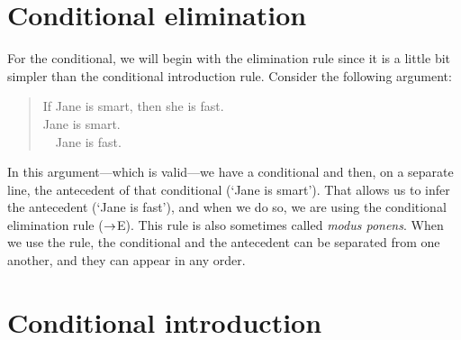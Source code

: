 \section{Conditional elimination}

For the conditional, we will begin with the elimination rule since it is a little bit simpler than the conditional introduction rule. Consider the following argument:
	\begin{quote}
		If Jane is smart, then she is fast.\\
		Jane is smart.\\ 
		\therefore~~Jane is fast.
	\end{quote}
In this argument---which is valid---we have a conditional and then, on a separate line, the antecedent of that conditional (`Jane is smart'). That allows us to infer the antecedent (`Jane is fast'), and when we do so, we are using the conditional elimination rule ($\rightarrow$E).
This rule is also sometimes called \emph{modus ponens}. When we use the rule, the conditional and the antecedent can be separated from one another, and they can appear in any order.


\section{Conditional introduction}

